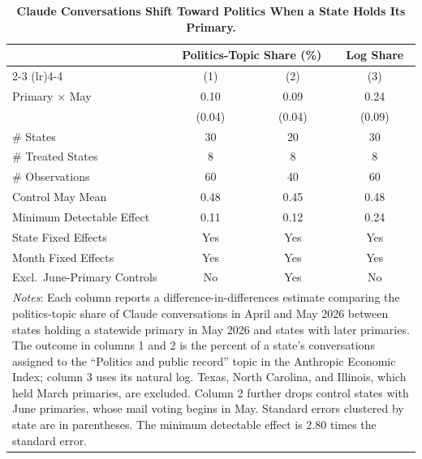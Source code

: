 \begin{table}[t]
\centering
\caption{\textbf{Claude Conversations Shift Toward Politics When a State Holds Its Primary.}\label{tab:aei_did}}
\begin{tabular}{lccc}
\toprule \toprule
 & \multicolumn{2}{c}{Politics-Topic Share (\%)} & Log Share \\
\cmidrule(lr){2-3} \cmidrule(lr){4-4}
 & (1) & (2) & (3) \\
\midrule
Primary $\times$ May & 0.10 & 0.09 & 0.24 \\
 & (0.04) & (0.04) & (0.09) \\[2mm]
\# States & 30 & 20 & 30 \\
\# Treated States & 8 & 8 & 8 \\
\# Observations & 60 & 40 & 60 \\
Control May Mean & 0.48 & 0.45 & 0.48 \\
Minimum Detectable Effect & 0.11 & 0.12 & 0.24 \\
\midrule
State Fixed Effects & Yes & Yes & Yes \\
Month Fixed Effects & Yes & Yes & Yes \\
Excl.\ June-Primary Controls & No & Yes & No \\
\bottomrule \bottomrule
\multicolumn{4}{p{0.95\textwidth}}{\footnotesize \textit{Notes}: Each column reports a difference-in-differences estimate comparing the politics-topic share of Claude conversations in April and May 2026 between states holding a statewide primary in May 2026 and states with later primaries. The outcome in columns 1 and 2 is the percent of a state's conversations assigned to the ``Politics and public record'' topic in the Anthropic Economic Index; column 3 uses its natural log. Texas, North Carolina, and Illinois, which held March primaries, are excluded. Column 2 further drops control states with June primaries, whose mail voting begins in May. Standard errors clustered by state are in parentheses. The minimum detectable effect is 2.80 times the standard error.} \\
\end{tabular}
\end{table}
